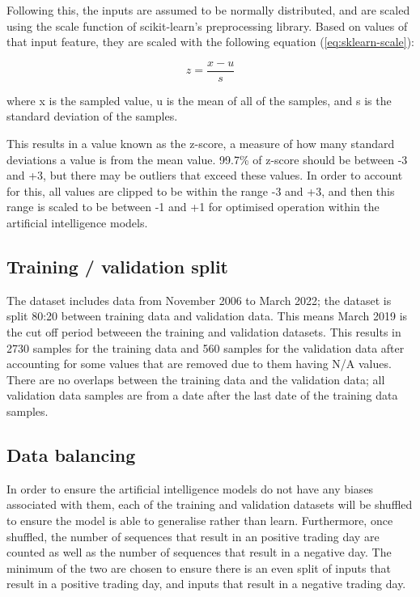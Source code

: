 Following this, the inputs are assumed to be normally distributed, and are scaled using the scale function of
scikit-learn's preprocessing library. Based on values of that input feature, they are scaled with the following
equation (\autoref{eq:sklearn-scale}):

\begin{equation}
    z = \frac{x - u}{s}
    \label{eq:sklearn-scale}
\end{equation}

where x is the sampled value, u is the mean of all of the samples, and s is the standard deviation of the samples.

This results in a value known as the z-score, a measure of how many standard deviations a value is from the mean value.
99.7\% of z-score should be between -3 and +3, but there may be outliers that exceed these values. In order to account for this,
all values are clipped to be within the range -3 and +3, and then this range is scaled to be between -1 and +1 for optimised
operation within the artificial intelligence models.

\subsection{Training / validation split}
The dataset includes data from November 2006 to March 2022; the dataset is split 80:20 between training data and
validation data. This means March 2019 is the cut off period betweeen the training and validation datasets. This
results in 2730 samples for the training data and 560 samples for the validation data after accounting for some
values that are removed due to them having N/A values. There are no overlaps between the training data and the
validation data; all validation data samples are from a date after the last date of the training data samples.

\subsection{Data balancing}
In order to ensure the artificial intelligence models do not have any biases associated with them, each of the training
and validation datasets will be shuffled to ensure the model is able to generalise rather than learn. Furthermore, once
shuffled, the number of sequences that result in an positive trading day are counted as well as the number of sequences that result in
a negative day. The minimum of the two are chosen to ensure there is an even split of inputs that result in a positive trading day,
and inputs that result in a negative trading day.

